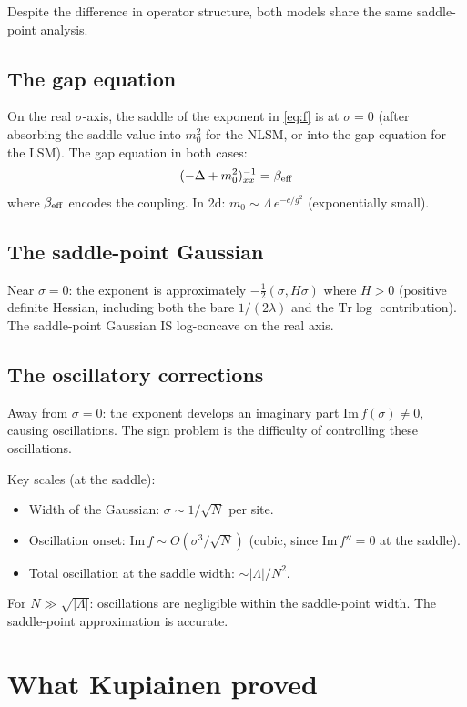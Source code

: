 \documentclass[12pt]{article}
\theoremstyle{definition}
\theoremstyle{remark}
\newcommand{\Tr}{\mathrm{Tr}}
\newcommand{\La}{\Lambda}
\begin{document}
Despite the difference in operator structure, both models share
the same saddle-point analysis.

\subsection{The gap equation}

On the real $\sigma$-axis, the saddle of the exponent in
\eqref{eq:f} is at $\sigma = 0$ (after absorbing the saddle
value into $m_0^2$ for the NLSM, or into the gap equation for the LSM).
The gap equation in both cases:
\begin{equation}
  (-\Delta+m_0^2)^{-1}_{xx} = \beta_{\rm eff}
\end{equation}
where $\beta_{\rm eff}$ encodes the coupling. In 2d:
$m_0 \sim \La\,e^{-c/g^2}$ (exponentially small).

\subsection{The saddle-point Gaussian}

Near $\sigma = 0$: the exponent is approximately
$-\tfrac{1}{2}(\sigma, H\sigma)$ where $H > 0$ (positive definite
Hessian, including both the bare $1/(2\lambda)$ and the $\Tr\log$
contribution). The saddle-point Gaussian IS log-concave on the
real axis.

\subsection{The oscillatory corrections}

Away from $\sigma = 0$: the exponent develops an imaginary part
$\mathrm{Im}\,f(\sigma) \ne 0$, causing oscillations. The sign problem
is the difficulty of controlling these oscillations.

Key scales (at the saddle):
\begin{itemize}
\item Width of the Gaussian: $\sigma \sim 1/\sqrt{N}$ per site.
\item Oscillation onset: $\mathrm{Im}\,f \sim O(\sigma^3/\sqrt{N})$
  (cubic, since $\mathrm{Im}\,f'' = 0$ at the saddle).
\item Total oscillation at the saddle width: $\sim |\La|/N^2$.
\end{itemize}
For $N \gg \sqrt{|\La|}$: oscillations are negligible within the
saddle-point width. The saddle-point approximation is accurate.

\section{What Kupiainen proved}
\end{document}
